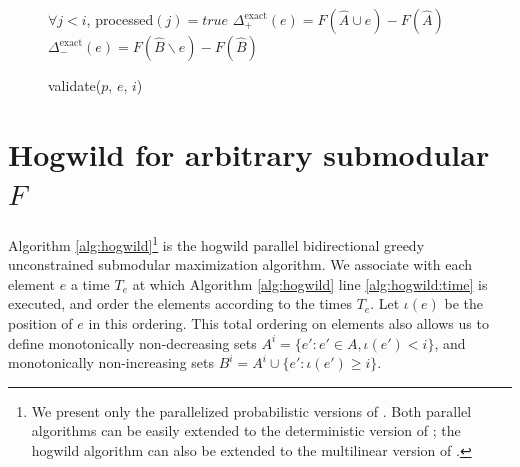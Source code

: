 \documentclass{article} %
\begin{document}
\begin{figure}[h]
\begin{multicols}{2}
\begin{minipage}{0.49\textwidth}
\begin{algorithm}[H]
\DontPrintSemicolon
\caption{validate($p$, $e$, $i$)}
\label{alg:occvalidate}
  \WaitUntil $\forall j < i$, processed$(j) = true$\;
  $\Delta_+^{\text{exact}}(e) = F(\hat{A} \cup e) - F(\hat{A})$\;\label{alg:occvalidate:deltaplus}
  $\Delta_-^{\text{exact}}(e) = F(\hat{B} \backslash e) - F(\hat{B})$\;\label{alg:occvalidate:deltaminus}
\end{algorithm}


  \label{fig:submax}
    \end{minipage}
    
    
    
  \end{multicols}
\end{figure}








\section{Hogwild for arbitrary submodular $F$}
Algorithm \ref{alg:hogwild}\footnote{We present only the parallelized probabilistic versions of \cite{buchbinder2012}. Both parallel algorithms can be easily extended to the deterministic version of \cite{buchbinder2012}; the hogwild algorithm can also be extended to the multilinear version of \cite{buchbinder2012}.} is the hogwild parallel bidirectional greedy unconstrained submodular maximization algorithm.
We associate with each element $e$ a time $T_e$ at which Algorithm \ref{alg:hogwild} line \ref{alg:hogwild:time} is executed, and order the elements according to the times $T_e$.
Let $\iota(e)$ be the position of $e$ in this ordering.
This total ordering on elements also allows us to define monotonically non-decreasing sets $A^i = \{e' : e' \in A, \iota(e') < i\}$, and monotonically non-increasing sets $B^i = A^i \cup \{e': \iota(e') \geq i\}$.
\end{document}
